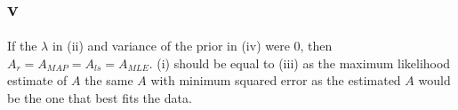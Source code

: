 \documentclass[twoside]{Homework}
\begin{document}
\subsection*{v}
If the $\lambda$ in (ii) and variance of the prior in (iv) were 0, then $A_{r} = A_{MAP} = A_{ls} = A_{MLE}$. (i) should be equal to  (iii) as the maximum likelihood estimate of $A$ the same $A$ with minimum squared error as the estimated $A$ would be the one that best fits the data.
\end{document}
